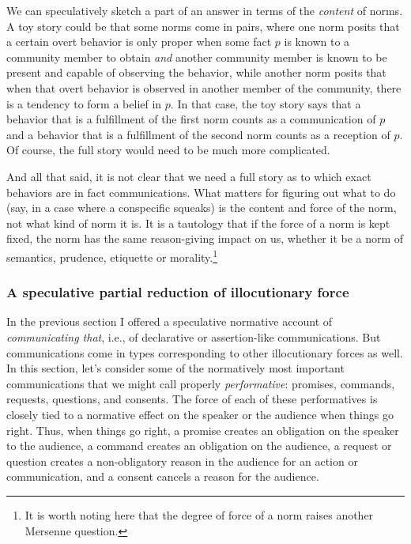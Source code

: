 We can speculatively sketch a part of an answer in terms of the \textit{content} of norms. A toy story could be that 
some norms come in pairs, where one norm posits that a certain overt behavior is only proper when some fact $p$ is known to a 
community member to obtain \textit{and} another community member is known to be present and capable of observing the behavior, while 
another 
norm posits that when that overt behavior is observed in another member of the community, there is a tendency to form a belief 
in $p$. In that case, the toy story says that a behavior that is a fulfillment of the first norm counts as a communication 
of $p$ and a behavior that is a fulfillment of the second norm counts as a reception of $p$. Of course, the full story would need
to be much more complicated.

And all that said, it is not clear that we need a full story as to which exact behaviors are in fact communications. What matters
for figuring out what to do (say, in a case where a conspecific squeaks) is the 
content and force of the norm, not what kind of norm it is. It is a tautology that if the 
force of a norm is kept fixed, the norm has the same reason-giving impact on us, whether it be a norm of semantics, prudence, 
etiquette or morality.\footnote{It is worth noting here that the degree of force
of a norm raises another Mersenne question.}

\subsubsection{A speculative partial reduction of illocutionary force}
In the previous section I offered a speculative normative account of \textit{communicating that}, i.e., of declarative
or assertion-like 
communications. But communications come in types corresponding to other illocutionary forces as well. In this section, 
let's consider some of the normatively most important communications that we might call properly \textit{performative}: promises, 
commands, requests, questions, and consents. The force of each of these performatives is closely tied to a normative effect on the speaker or the audience when things go right. Thus, when things go right, a promise creates 
an obligation on the speaker to the audience, a command creates an obligation on the audience, a request or
question creates a non-obligatory reason in the audience for an action or communication, and a consent cancels a reason 
for the audience. 

